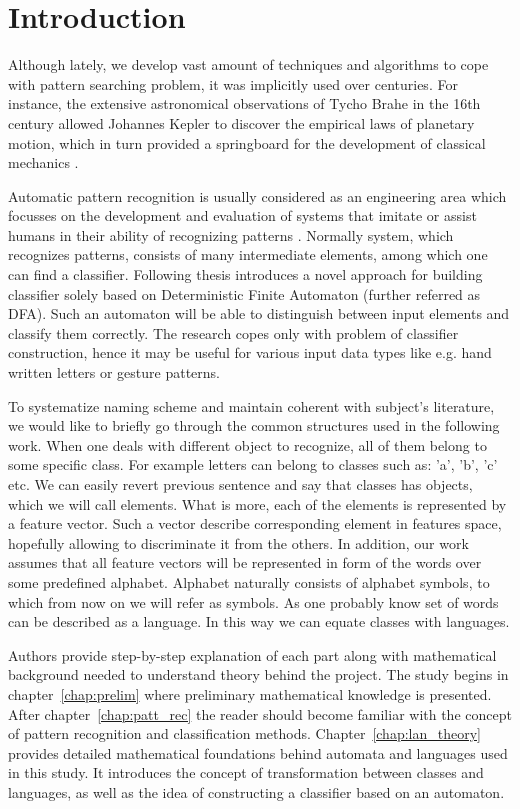 \documentclass{mini}
\begin{document}
\chapter*{Introduction}
Although lately, we develop vast amount of techniques and algorithms to cope with pattern searching problem, it was implicitly used over centuries. For instance, the extensive astronomical observations of Tycho Brahe in the 16th century allowed Johannes Kepler to discover the empirical laws of
planetary motion, which in turn provided a springboard for the development of classical mechanics \cite{bishop_book}.

Automatic pattern recognition is usually considered as an engineering area which focusses on the development and evaluation of systems that imitate or assist humans in their ability of recognizing patterns \cite{duch_uuu}. Normally system, which recognizes patterns, consists of many intermediate elements, among which one can find a classifier. Following thesis introduces a novel approach for building classifier solely based on  Deterministic Finite Automaton (further referred as DFA). Such an automaton will be able to distinguish between input elements and classify them correctly. The research copes only with problem of classifier construction, hence it may be useful for various input data types like e.g. hand written letters or gesture patterns.

To systematize naming scheme and maintain coherent with subject's literature, we would like to briefly go through the common structures used in the following work. When one deals with different object to recognize, all of them belong to some specific class. For example letters can belong to classes such as: 'a', 'b', 'c' etc. We can easily revert previous sentence and say that classes has objects, which we will call elements. What is more, each of the elements is represented by a feature vector. Such a vector describe corresponding element in features space, hopefully allowing to discriminate it from the others. In addition, our work assumes that all feature vectors will be represented in form of the words over some predefined alphabet. Alphabet naturally consists of alphabet symbols, to which from now on we will refer as symbols. As one probably know set of words can be described as a language. In this way we can equate classes with languages.

Authors provide step-by-step explanation of each part along with mathematical background needed to understand theory behind the project. The study begins in chapter~\ref{chap:prelim} where preliminary mathematical knowledge is presented.
After chapter~\ref{chap:patt_rec} the reader should become familiar with the concept of pattern recognition and classification methods. Chapter~\ref{chap:lan_theory} provides detailed mathematical foundations behind automata and languages used in this study. It introduces the concept of transformation between classes and languages, as well as the idea of constructing a classifier based on an automaton.
\end{document}
